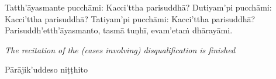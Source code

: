 \documentclass[11pt]{article}
\begin{document}
\begin{paracol}{2}
\begin{column}
\begin{flushleft}
Tatth’āyasmante pucchāmi: Kacci’ttha parisuddhā?
Dutiyam’pi pucchāmi: Kacci’ttha parisuddhā?
Tatiyam’pi pucchāmi: Kacci’ttha parisuddhā?
Parisuddh’etth’āyasmanto, tasmā tuṇhī, evam’etaṁ dhārayāmi.
\switchcolumn*
\end{flushleft}

{\itshape\footnotesize
The recitation of the (cases involving) disqualification is finished
}
\switchcolumn

\begin{flushleft}
Pārājik’uddeso niṭṭhito
\switchcolumn*
\end{flushleft}


\end{column}
\end{paracol}
\end{document}
